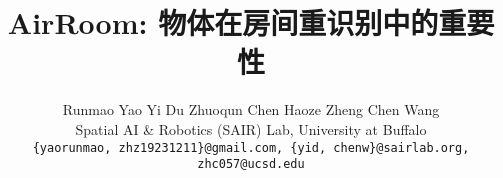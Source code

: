 \documentclass[10pt,twocolumn,letterpaper]{article}
\title{AirRoom: 物体在房间重识别中的重要性}
\author{
Runmao Yao \quad
Yi Du \quad
Zhuoqun Chen \quad
Haoze Zheng \quad
Chen Wang \\
Spatial AI \& Robotics (SAIR) Lab, University at Buffalo \\
{\tt\small \{yaorunmao, zhz19231211\}@gmail.com, \{yid, chenw\}@sairlab.org, zhc057@ucsd.edu}
}
\begin{document}
\maketitle






{
    \small
    
    
}


\end{document}
